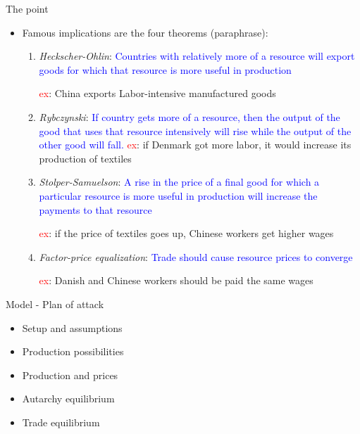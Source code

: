 \documentclass[ignorenonframetext,]{beamer}
\begin{document}
\begin{frame}{The point}

    \begin{itemize}
        \item Famous implications are the four theorems (paraphrase):
        \begin{enumerate}
            \item \emph{Heckscher-Ohlin}: \textcolor{blue}{Countries with relatively more of a resource will export goods for which that resource is more useful in production} 

\textcolor{red}{ex}: China exports Labor-intensive manufactured goods
            \item \emph{Rybczynski}: \textcolor{blue}{If country gets more of a resource, then the output of the good that uses that resource intensively will rise while the output of the other good will fall.}
\textcolor{red}{ex}: if Denmark got more labor, it would increase its production of textiles
            \item \emph{Stolper-Samuelson}: \textcolor{blue}{A rise in the price of a final good for which a particular resource is more useful in production will increase the payments to that resource}

\textcolor{red}{ex}: if the price of textiles goes up, Chinese workers get higher wages
            \item \emph{Factor-price equalization}: \textcolor{blue}{Trade should cause resource prices to converge}

\textcolor{red}{ex}: Danish and Chinese workers should be paid the same wages
        \end{enumerate}
    \end{itemize}

\end{frame}

\begin{frame}{Model - Plan of attack}

        \begin{itemize}
            \item Setup and assumptions
            \item Production possibilities
            \item Production and prices
            \item Autarchy equilibrium
            \item Trade equilibrium
        \end{itemize}

\end{frame}
\end{document}
